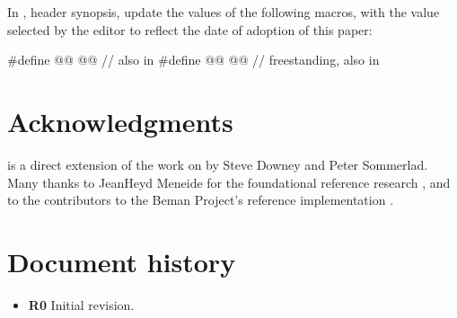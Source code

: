\documentclass[a4paper,10pt,oneside,openany,final,article]{memoir}
\begin{document}
In , header  synopsis, update the values
of the following macros, with the value selected by the editor to reflect the
date of adoption of this paper:

\begin{codeblock}
#define @@               @@ // also in 
#define @@  @@ // freestanding, also in 
\end{codeblock}



\chapter{Acknowledgments}

 is a direct extension of the work on
 \cite{P2988R12} by Steve Downey and Peter Sommerlad. Many
thanks to JeanHeyd Meneide for the foundational reference research
\cite{P1683R0, REFBIND}, and to the contributors to the Beman Project's
 reference implementation \cite{Downey_beman_expected}.

\chapter*{Document history}

\begin{itemize}
\item \textbf{R0} Initial revision.
\end{itemize}

\renewcommand{\bibname}{References}


\end{document}

